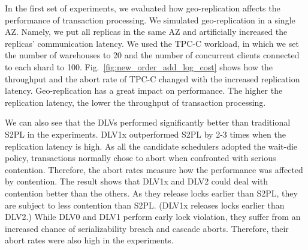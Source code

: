 \documentclass[conference]{IEEEtran}
\begin{document}
In the first set of experiments, we evaluated how geo-replication affects the performance of transaction processing.
We simulated geo-replication in a single AZ.
Namely, we put all replicas in the same AZ and artificially increased the replicas' communication latency.
We used the TPC-C workload, in which we set the number of warehouses to 20 and the number of concurrent clients connected to each shard to 100.
Fig.~\ref{fig:new_order_add_log_cost} shows how the throughput and the abort rate of TPC-C changed with the increased replication latency.
Geo-replication has a great impact on performance. The higher the replication latency, the lower the throughput of transaction processing.

We can also see that the DLVs performed significantly better than traditional S2PL in the experiments.
DLV1x outperformed S2PL by 2-3 times when the replication latency is high.
As all the candidate schedulers adopted the wait-die policy, transactions normally chose to abort when confronted with serious contention.
Therefore, the abort rates measure how the performance was affected by contention.
The result shows that DLV1x and DLV2 could deal with contention better than the others.
As they release locks earlier than S2PL, they are subject to less contention than S2PL. (DLV1x releases locks earlier than DLV2.)
While DLV0 and DLV1 perform early lock violation, they suffer from an increased chance of serializability breach and cascade aborts.
Therefore, their abort rates were also high in the experiments.
\end{document}
